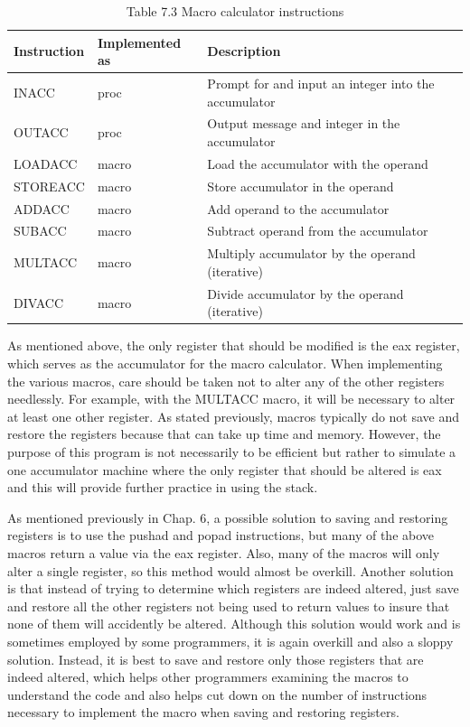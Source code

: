 \documentclass[10pt]{article}
\begin{document}
\begin{table}[h]
\begin{center}
\captionsetup{labelformat=empty}
\caption{Table 7.3 Macro calculator instructions}
\begin{tabular}{|l|l|l|}
\hline
Instruction & Implemented as & Description \\
\hline
INACC & proc & Prompt for and input an integer into the accumulator \\
\hline
OUTACC & proc & Output message and integer in the accumulator \\
\hline
LOADACC & macro & Load the accumulator with the operand \\
\hline
STOREACC & macro & Store accumulator in the operand \\
\hline
ADDACC & macro & Add operand to the accumulator \\
\hline
SUBACC & macro & Subtract operand from the accumulator \\
\hline
MULTACC & macro & Multiply accumulator by the operand (iterative) \\
\hline
DIVACC & macro & Divide accumulator by the operand (iterative) \\
\hline
\end{tabular}
\end{center}
\end{table}

As mentioned above, the only register that should be modified is the eax register, which serves as the accumulator for the macro calculator. When implementing the various macros, care should be taken not to alter any of the other registers needlessly. For example, with the MULTACC macro, it will be necessary to alter at least one other register. As stated previously, macros typically do not save and restore the registers because that can take up time and memory. However, the purpose of this program is not necessarily to be efficient but rather to simulate a one accumulator machine where the only register that should be altered is eax and this will provide further practice in using the stack.

As mentioned previously in Chap. 6, a possible solution to saving and restoring registers is to use the pushad and popad instructions, but many of the above macros return a value via the eax register. Also, many of the macros will only alter a single register, so this method would almost be overkill. Another solution is that instead of trying to determine which registers are indeed altered, just save and restore all the other registers not being used to return values to insure that none of them will accidently be altered. Although this solution would work and is sometimes employed by some programmers, it is again overkill and also a sloppy solution. Instead, it is best to save and restore only those registers that are indeed altered, which helps other programmers examining the macros to understand the code and also helps cut down on the number of instructions necessary to implement the macro when saving and restoring registers.
\end{document}
